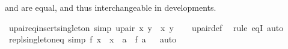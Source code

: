 \begin{isabellebody}
\begin{isamarkuptext}
 and  are equal, and thus
interchangeable in developments.%
\end{isamarkuptext}\isamarkuptrue%
\isamarkupfalse%
\ upair{\isacharunderscore}{\kern0pt}eq{\isacharunderscore}{\kern0pt}insert{\isacharunderscore}{\kern0pt}singleton\ {\isacharbrackleft}{\kern0pt}simp{\isacharbrackright}{\kern0pt}{\isacharcolon}{\kern0pt}\ {\isachardoublequoteopen}upair\ x\ y\ {\isacharequal}{\kern0pt}\ {\isacharbraceleft}{\kern0pt}x{\isacharcomma}{\kern0pt}\ y{\isacharbraceright}{\kern0pt}{\isachardoublequoteclose}\isanewline
%
\isadelimproof
\ \ %
\endisadelimproof
%
\isatagproof
{}\isamarkupfalse%
\ upair{\isacharunderscore}{\kern0pt}def\ \isamarkupfalse%
\ {\isacharparenleft}{\kern0pt}rule\ eqI{\isacharparenright}{\kern0pt}\ auto%
\endisatagproof
{\isafoldproof}%
%
\isadelimproof
%
\endisadelimproof
%
\isadelimdocument
%
\endisadelimdocument
%
\isatagdocument
%
\isamarkuptrue%
%
\endisatagdocument
{\isafolddocument}%
%
\isadelimdocument
%
\endisadelimdocument
{}\isamarkupfalse%
\ repl{\isacharunderscore}{\kern0pt}singleton{\isacharunderscore}{\kern0pt}eq\ {\isacharbrackleft}{\kern0pt}simp{\isacharbrackright}{\kern0pt}{\isacharcolon}{\kern0pt}\ {\isachardoublequoteopen}{\isacharbraceleft}{\kern0pt}f\ x\ {\isacharbar}{\kern0pt}\ x\ {\isasymin}\ {\isacharbraceleft}{\kern0pt}a{\isacharbraceright}{\kern0pt}{\isacharbraceright}{\kern0pt}\ {\isacharequal}{\kern0pt}\ {\isacharbraceleft}{\kern0pt}f\ a{\isacharbraceright}{\kern0pt}{\isachardoublequoteclose}%
\isadelimproof
\ %
\endisadelimproof
%
\isatagproof
{}\isamarkupfalse%
\ auto%
\endisatagproof
{\isafoldproof}%
%
\isadelimproof
%
\endisadelimproof
\isanewline
\isanewline
%
\isadelimtheory
\isanewline
%
\endisadelimtheory
%
\isatagtheory
{}\isamarkupfalse%
%
\endisatagtheory
{\isafoldtheory}%
%
\isadelimtheory
%
\endisadelimtheory
%
\end{isabellebody}%
\endinput
